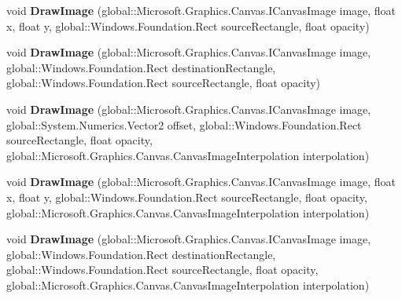 \begin{DoxyCompactItemize}
void {\bfseries Draw\+Image} (global\+::\+Microsoft.\+Graphics.\+Canvas.\+I\+Canvas\+Image image, float x, float y, global\+::\+Windows.\+Foundation.\+Rect source\+Rectangle, float opacity)
\item 
\mbox{\label{interface_microsoft_1_1_graphics_1_1_canvas_1_1_i_canvas_drawing_session_aa765d0fa935b76101e503c6434376586}} 
void {\bfseries Draw\+Image} (global\+::\+Microsoft.\+Graphics.\+Canvas.\+I\+Canvas\+Image image, global\+::\+Windows.\+Foundation.\+Rect destination\+Rectangle, global\+::\+Windows.\+Foundation.\+Rect source\+Rectangle, float opacity)
\item 
\mbox{\label{interface_microsoft_1_1_graphics_1_1_canvas_1_1_i_canvas_drawing_session_a9e068a61002b3491bc70ea21e2ee8517}} 
void {\bfseries Draw\+Image} (global\+::\+Microsoft.\+Graphics.\+Canvas.\+I\+Canvas\+Image image, global\+::\+System.\+Numerics.\+Vector2 offset, global\+::\+Windows.\+Foundation.\+Rect source\+Rectangle, float opacity, global\+::\+Microsoft.\+Graphics.\+Canvas.\+Canvas\+Image\+Interpolation interpolation)
\item 
\mbox{\label{interface_microsoft_1_1_graphics_1_1_canvas_1_1_i_canvas_drawing_session_aa7b11bec4901a474249edf660e7decd5}} 
void {\bfseries Draw\+Image} (global\+::\+Microsoft.\+Graphics.\+Canvas.\+I\+Canvas\+Image image, float x, float y, global\+::\+Windows.\+Foundation.\+Rect source\+Rectangle, float opacity, global\+::\+Microsoft.\+Graphics.\+Canvas.\+Canvas\+Image\+Interpolation interpolation)
\item 
\mbox{\label{interface_microsoft_1_1_graphics_1_1_canvas_1_1_i_canvas_drawing_session_a95fe7324d80e934f84faf2e041b53f43}} 
void {\bfseries Draw\+Image} (global\+::\+Microsoft.\+Graphics.\+Canvas.\+I\+Canvas\+Image image, global\+::\+Windows.\+Foundation.\+Rect destination\+Rectangle, global\+::\+Windows.\+Foundation.\+Rect source\+Rectangle, float opacity, global\+::\+Microsoft.\+Graphics.\+Canvas.\+Canvas\+Image\+Interpolation interpolation)
\item 
\mbox{\label{interface_microsoft_1_1_graphics_1_1_canvas_1_1_i_canvas_drawing_session_a8b677c4de87ab3a0d18e8a4e7904562e}} 

\end{DoxyCompactItemize}
